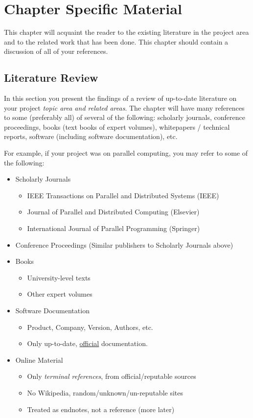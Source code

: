 \documentclass{report}[a4paper,12pt,onecolumn]
\begin{document}
\section{Chapter Specific Material}

This chapter will acquaint the reader to the existing literature in the project area and to the related work that has been done. This chapter should contain a discussion of all of your references.

\subsection{Literature Review}

In this section you present the findings of a review of up-to-date literature on your project \textit{topic area and related areas}. The chapter will have many references to some (preferably all) of several of the following: scholarly journals, conference proceedings, books (text books of expert volumes), whitepapers / technical reports, software (including software documentation), etc.

For example, if your project was on parallel computing, you may refer to some of the following:

\begin{itemize}
    \item Scholarly Journals
    \begin{itemize}
        \item IEEE Transactions on Parallel and Distributed Systems (IEEE)
        \item Journal of Parallel and Distributed Computing (Elsevier)
        \item International Journal of Parallel Programming (Springer)
    \end{itemize}
    \item Conference Proceedings (Similar publishers to Scholarly Journals above)
    \item Books
    \begin{itemize}
        \item University-level texts
        \item Other expert volumes
    \end{itemize}
    \item Software Documentation
    \begin{itemize}
        \item Product, Company, Version, Authors, etc.
        \item Only up-to-date, \underline{official} documentation.
    \end{itemize}
    \item Online Material
    \begin{itemize}
        \item Only \textit{terminal references}, from official/reputable sources
        \item No Wikipedia, random/unknown/un-reputable sites
        \item Treated as endnotes, not a reference (more later)
    \end{itemize}
\end{itemize}
\end{document}
